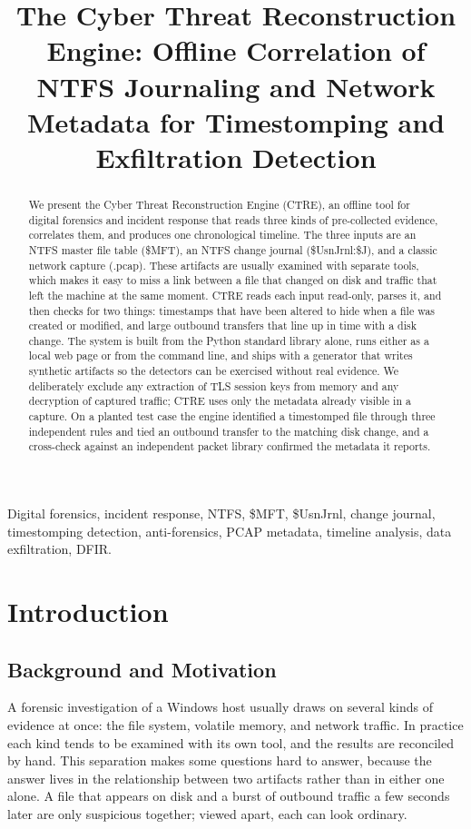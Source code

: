 \documentclass[12pt,onecolumn]{IEEEtran}
\title{The Cyber Threat Reconstruction Engine: Offline Correlation of NTFS Journaling and Network Metadata for Timestomping and Exfiltration Detection}
\author{}
\date{}
\begin{document}
\maketitle

\begin{abstract}
We present the Cyber Threat Reconstruction Engine (CTRE), an offline tool for digital forensics and incident response that reads three kinds of pre-collected evidence, correlates them, and produces one chronological timeline. The three inputs are an NTFS master file table (\$MFT), an NTFS change journal (\$UsnJrnl:\$J), and a classic network capture (.pcap). These artifacts are usually examined with separate tools, which makes it easy to miss a link between a file that changed on disk and traffic that left the machine at the same moment. CTRE reads each input read-only, parses it, and then checks for two things: timestamps that have been altered to hide when a file was created or modified, and large outbound transfers that line up in time with a disk change. The system is built from the Python standard library alone, runs either as a local web page or from the command line, and ships with a generator that writes synthetic artifacts so the detectors can be exercised without real evidence. We deliberately exclude any extraction of TLS session keys from memory and any decryption of captured traffic; CTRE uses only the metadata already visible in a capture. On a planted test case the engine identified a timestomped file through three independent rules and tied an outbound transfer to the matching disk change, and a cross-check against an independent packet library confirmed the metadata it reports.
\end{abstract}

\begin{IEEEkeywords}
Digital forensics, incident response, NTFS, \$MFT, \$UsnJrnl, change journal, timestomping detection, anti-forensics, PCAP metadata, timeline analysis, data exfiltration, DFIR.
\end{IEEEkeywords}

\section{Introduction}

\subsection{Background and Motivation}
A forensic investigation of a Windows host usually draws on several kinds of evidence at once: the file system, volatile memory, and network traffic. In practice each kind tends to be examined with its own tool, and the results are reconciled by hand. This separation makes some questions hard to answer, because the answer lives in the relationship between two artifacts rather than in either one alone. A file that appears on disk and a burst of outbound traffic a few seconds later are only suspicious together; viewed apart, each can look ordinary.
\end{document}
